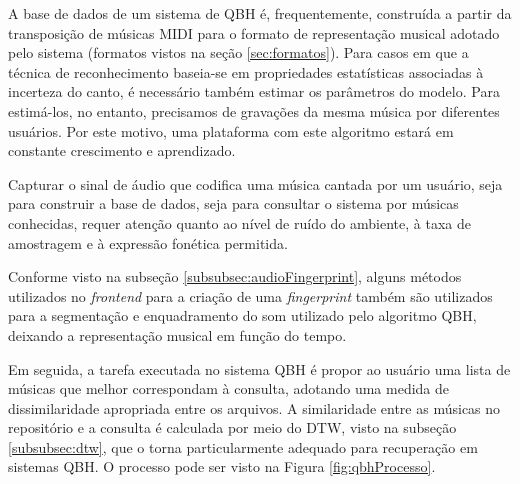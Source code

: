 A base de dados de um sistema de QBH é, frequentemente, construída a partir da transposição de músicas MIDI para o formato de representação musical adotado pelo sistema (formatos vistos na seção \ref{sec:formatos}). Para casos em que a técnica de reconhecimento baseia-se em propriedades estatísticas associadas à incerteza do canto, é necessário também estimar os parâmetros do modelo. Para estimá-los, no entanto, precisamos de gravações da mesma música por diferentes usuários. Por este motivo, uma plataforma com este algoritmo estará em constante crescimento e aprendizado.

Capturar o sinal de áudio que codifica uma música cantada por um usuário, seja para construir a base de dados, seja para consultar o sistema por músicas conhecidas, requer atenção quanto ao nível de ruído do ambiente, à taxa de amostragem e à expressão fonética permitida. 

Conforme visto na subseção \ref{subsubsec:audioFingerprint}, alguns métodos utilizados no \textit{frontend} para a criação de uma \textit{fingerprint} também são utilizados para a segmentação e enquadramento do som utilizado pelo algoritmo QBH, deixando a representação musical em função do tempo.

Em seguida, a tarefa executada no sistema QBH é propor ao usuário uma lista de músicas que melhor correspondam à consulta, adotando uma medida de dissimilaridade apropriada entre os arquivos. A similaridade entre as músicas no repositório e a consulta é calculada por meio do DTW, visto na subseção \ref{subsubsec:dtw}, que o torna particularmente adequado para recuperação em sistemas QBH. O processo pode ser visto na Figura \ref{fig:qbhProcesso}.

